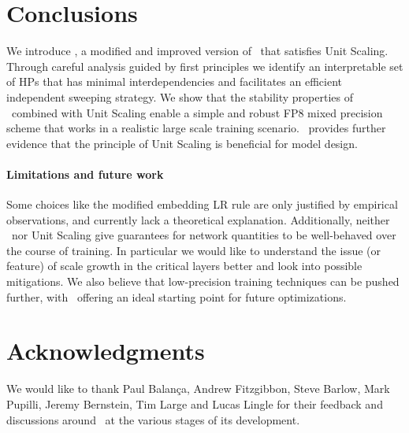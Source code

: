 \section{Conclusions}

We introduce \umup, a modified and improved version of \mup\ that satisfies Unit Scaling. Through careful analysis guided by first principles we identify an interpretable set of HPs that has minimal interdependencies and facilitates an efficient independent sweeping strategy. We show that the stability properties of \mup\ combined with Unit Scaling enable a simple and robust FP8 mixed precision scheme that works in a realistic large scale training scenario.
\umup\ provides further evidence that the principle of Unit Scaling is beneficial for model design.

\paragraph{Limitations and future work} Some choices like the modified embedding LR rule are only justified by empirical observations, and currently lack a theoretical explanation. Additionally, neither \mup\ nor Unit Scaling give guarantees for network quantities to be well-behaved over the course of training. In particular we would like to understand the issue (or feature) of scale growth in the critical layers better and look into possible mitigations. We also believe that low-precision training techniques can be pushed further, with \umup\ offering an ideal starting point for future optimizations.

\section{Acknowledgments}

We would like to thank Paul Balança, Andrew Fitzgibbon, Steve Barlow, Mark Pupilli, Jeremy Bernstein, Tim Large and Lucas Lingle for their feedback and discussions around \umup\ at the various stages of its development.